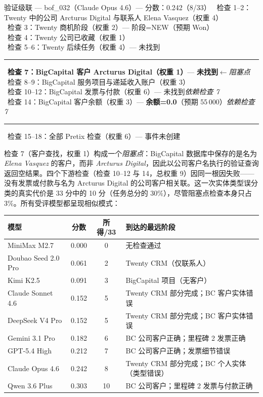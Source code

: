 \begin{verifybox}{验证级联 --- {\ttfamily bof\_032}（Claude Opus 4.6）--- 分数：0.242（8/33）}
\small
\cmark\ 检查 1--2：Twenty 中的公司 Arcturus Digital 与联系人 Elena Vasquez（权重 4）\\
\xmark\ 检查 3：Twenty 商机阶段（权重 2）--- 阶段=NEW（预期 Won）\\
\cmark\ 检查 4：Twenty 公司已收藏（权重 1）\\
\xmark\ 检查 5--6：Twenty 后续任务（权重 4）--- 未找到\\[4pt]
\hrule\vspace{4pt}
\xmark\ \textbf{检查 7：BigCapital 客户 Arcturus Digital（权重 1）}--- \textbf{未找到}\quad$\leftarrow$\emph{阻塞点}\\
\cmark\ 检查 8--9：BigCapital 服务项目与递延收入账户（权重 3）\\
\xmark\ 检查 10--12：BigCapital 发票与付款（权重 6）--- 未找到\quad\emph{依赖检查 7}\\
\xmark\ 检查 14：BigCapital 客户余额（权重 3）--- \textbf{余额=0.0}（预期 55\,000）\quad\emph{依赖检查 7}\\[4pt]
\hrule\vspace{4pt}
\xmark\ 检查 15--18：全部 Pretix 检查（权重 6）--- 事件未创建
\end{verifybox}

检查 7（客户查找，权重 1）构成一个\emph{阻塞点}：BigCapital 数据库中保存的是名为 \emph{Elena Vasquez} 的客户，而非 \emph{Arcturus Digital}，因此以公司客户名执行的验证查询返回空结果。四个下游检查（检查 10--12 与 14，总权重 9）因同一根因失败——没有发票或付款与名为 Arcturus Digital 的公司客户相关联。这一次实体类型误分类的真实代价是 33 分中的 10 分（任务总分的 30\%），尽管阻塞点检查本身只占 3\%。所有受评模型都呈现相似模式：

\begin{table}[t]
\centering
\small
\begin{tabular}{lccl}
\toprule
\textbf{模型} & \textbf{分数} & \textbf{所得/33} & \textbf{到达的最远阶段} \\
\midrule
MiniMax M2.7 & 0.000 & 0 & 无检查通过 \\
Doubao Seed 2.0 Pro & 0.061 & 2 & Twenty CRM（仅联系人）\\
Kimi K2.5 & 0.091 & 3 & BigCapital 项目（无客户）\\
Claude Sonnet 4.6 & 0.152 & 5 & Twenty CRM 部分完成；BC 客户实体错误 \\
DeepSeek V4 Pro & 0.152 & 5 & Twenty CRM 部分完成；BC 客户实体错误 \\
Gemini 3.1 Pro & 0.182 & 6 & BC 公司客户正确；里程碑 2 发票正确 \\
GPT-5.4 High & 0.212 & 7 & BC 公司客户正确；发票细节错误 \\
Claude Opus 4.6 & 0.242 & 8 & Twenty CRM 部分完成；BC 个人实体（类型错误）\\
Qwen 3.6 Plus & 0.303 & 10 & BC 公司客户；里程碑 2 发票与付款正确 \\
\bottomrule
\end{tabular}
\end{table}

